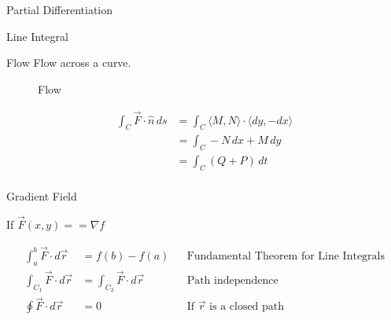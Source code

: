 \begin{section}{Partial Differentiation}
\begin{section}{Line Integral}
\begin{subsection}{Flow}
      Flow across a curve.
      \begin{figure}[h!]
        \begin{center}
          \caption{Flow}
        \end{center}
      \end{figure}
      \begin{align*}
        \int_C \vec{F}\cdot\hat{n}\,ds
                                      &= \int_C \langle M,N \rangle \cdot \langle dy,-dx \rangle \\
                                      &= \int_C -N\,dx + M\,dy \\
                                      &= \int_C (Q + P) \,dt \\
      \end{align*}
      \FloatBarrier
    \end{subsection} %
  \end{section}

  \begin{section}{Gradient Field}

    If $\vec{F}(x,y) == \nabla{f}$

    \begin{align*}
      \int_a^b \vec{F} \cdot d\vec{r} &= f(b) - f(a) &&
      \text{Fundamental Theorem for Line Integrals}\\
      \int_{C_1} \vec{F} \cdot d\vec{r} &= \int_{C_2} \vec{F} \cdot d\vec{r} &&
      \text{Path independence}\\
      \oint \vec{F} \cdot d\vec{r} &= 0 &&
      \text{If $\vec{r}$ is a closed path}\\
    \end{align*}
  \end{section}


\end{section}

